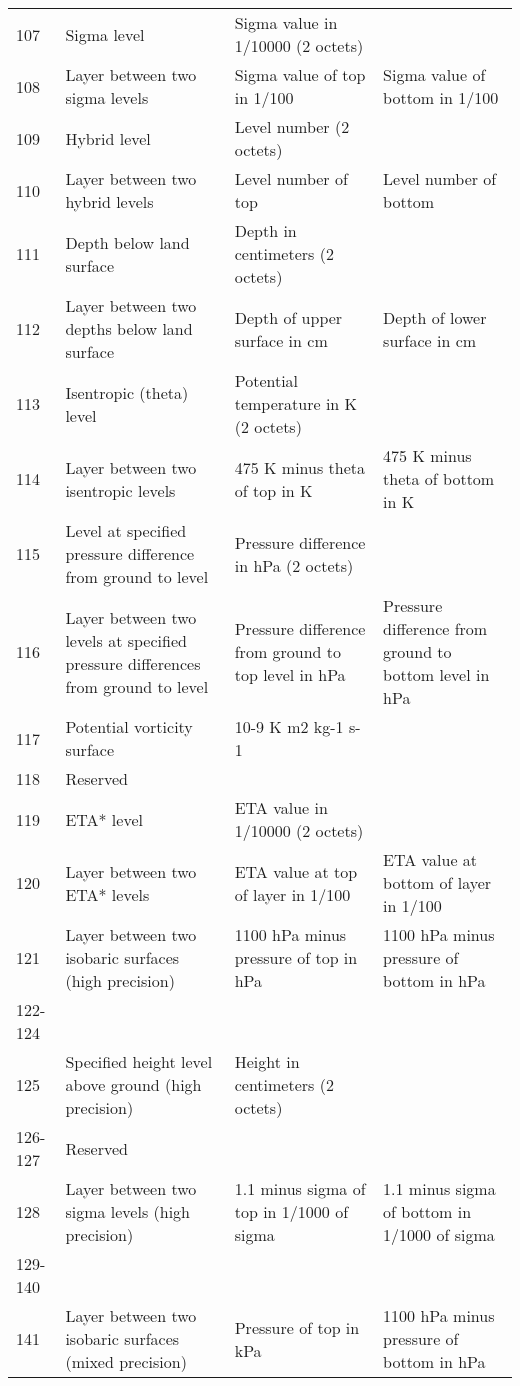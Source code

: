 \documentclass[final,12pt,a4paper,twoside]{book}
\begin{document}
\begin{scriptsize}
\begin{longtable}{|@{\hspace{0.5mm}}l@{\hspace{0.5mm}}|@{\hspace{0.5mm}}p{4.0cm}@{\hspace{0.5mm}}|@{\hspace{0.5mm}}p{4.0cm}@{\hspace{0.5mm}}|@{\hspace{0.5mm}}p{4.0cm}@{\hspace{0.5mm}}|}
107     & Sigma level & Sigma value in 1/10000 (2 octets) & \\
108     & Layer between two sigma levels & Sigma value of top in 1/100 & Sigma value of bottom in 1/100 \\
109     & Hybrid level & Level number (2 octets) & \\
110     & Layer between two hybrid levels & Level number of top & Level number of bottom \\
111     & Depth below land surface & Depth in centimeters (2 octets) & \\
112     & Layer between two depths below land surface & Depth of upper surface in cm & Depth of lower surface in cm \\
113     & Isentropic (theta) level & Potential temperature in K (2 octets) & \\
114     & Layer between two isentropic levels & 475 K minus theta of top in K & 475 K minus theta of bottom in K \\
115     & Level at specified pressure difference from ground to level & Pressure difference in hPa (2 octets) & \\
116     & Layer between two levels at specified pressure differences from ground to level & Pressure difference from ground to top level in hPa & Pressure difference from ground to bottom level in hPa \\
117     & Potential vorticity surface & 10-9 K m2 kg-1 s-1 & \\
118     & Reserved & & \\
119     & ETA* level & ETA value in 1/10000 (2 octets) & \\
120     & Layer between two ETA* levels & ETA value at top of layer in 1/100 & ETA value at bottom of layer in 1/100 \\
121     & Layer between two isobaric surfaces (high precision) & 1100 hPa minus pressure of top in hPa & 1100 hPa minus pressure of bottom in hPa \\
122-124 & & & \\
125     & Specified height level above ground (high precision) & Height in centimeters (2 octets)  & \\
126-127 & Reserved & \\
128     & Layer between two sigma levels (high precision) & 1.1 minus sigma of top in 1/1000 of sigma & 1.1 minus sigma of bottom in 1/1000 of sigma \\
129-140 & & & \\
141     & Layer between two isobaric surfaces (mixed precision) & Pressure of top in kPa & 1100 hPa minus pressure of bottom in hPa \\

\end{longtable}
\end{scriptsize}
\end{document}
